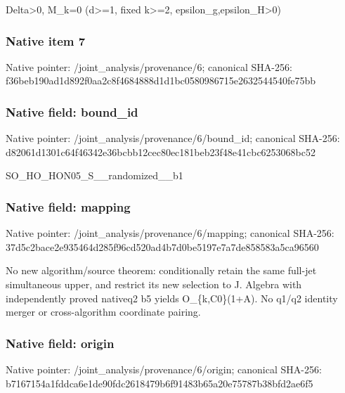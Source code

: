 \documentclass[10pt,a4paper]{article}
\begin{document}
\begingroup\raggedright\sloppy Delta>0,\allowbreak{} M\_\allowbreak{}k=\allowbreak{}0 (d>=\allowbreak{}1,\allowbreak{} fixed k>=\allowbreak{}2,\allowbreak{} epsilon\_\allowbreak{}g,\allowbreak{}epsilon\_\allowbreak{}H>0)\par\endgroup

\subsubsection{Native item 7}
Native pointer: /joint\_\allowbreak{}analysis/provenance/6; canonical SHA-256: f36beb190ad1d892f0aa2c8f4684888d1d1bc0580986715e2632544540fe75bb

\subsubsection{Native field: bound\_\allowbreak{}id}
Native pointer: /joint\_\allowbreak{}analysis/provenance/6/bound\_\allowbreak{}id; canonical SHA-256: d82061d1301c64f46342e36bcbb12cec80ec181beb23f48e41cbc6253068bc52

\begingroup\raggedright\sloppy SO\_\allowbreak{}HO\_\allowbreak{}HON05\_\allowbreak{}S\_\allowbreak{}\_\allowbreak{}randomized\_\allowbreak{}\_\allowbreak{}b1\par\endgroup

\subsubsection{Native field: mapping}
Native pointer: /joint\_\allowbreak{}analysis/provenance/6/mapping; canonical SHA-256: 37d5c2bace2e935464d285f96cd520ad4b7d0be5197e7a7de858583a5ca96560

\begingroup\raggedright\sloppy No new algorithm/\allowbreak{}source theorem:\allowbreak{} conditionally retain the same full-jet simultaneous upper,\allowbreak{} and restrict its new selection to J. Algebra with independently proved nativeq2 b5 yields O\_\allowbreak{}\{k,\allowbreak{}C0\}(1+A). No q1/\allowbreak{}q2 identity merger or cross-algorithm coordinate pairing.\par\endgroup

\subsubsection{Native field: origin}
Native pointer: /joint\_\allowbreak{}analysis/provenance/6/origin; canonical SHA-256: b7167154a1fddca6e1de90fdc2618479b6f91483b65a20e75787b38bfd2ae6f5
\end{document}
